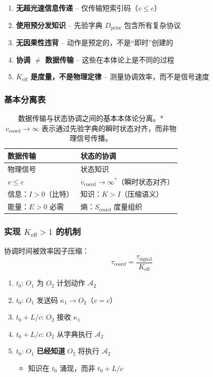 \documentclass[11pt,a4paper]{article}
\begin{document}
	\begin{enumerate}[leftmargin=*]
		\item \textbf{无超光速信息传递} – 仅传输短索引码（$v \leq c$）
		\item \textbf{使用预分发知识} – 先验字典 $D_{\text{prior}}$ 包含所有复杂协议
		\item \textbf{无因果性违背} – 动作是预定的，不是“即时”创建的
		\item \textbf{协调 $\neq$ 数据传输} – 这些在本体论上是不同的过程
		\item \textbf{$K_{\mathrm{eff}}$ 是度量，不是物理定律} – 测量协调效率，而不是信号速度
	\end{enumerate}
	
	\subsubsection{基本分离表}
	
	\begin{table}[H]
		\centering
		\begin{tabular}{|p{}|p{}|}
			\hline
			\textbf{数据传输} & \textbf{状态的协调} \\
			\hline
			物理信号 & 状态知识 \\
			$v \leq c$ & $v_{\text{coord}} \to \infty^*$（瞬时状态对齐） \\
			信息：$I > 0$（比特） & 知识：$K > I$（压缩语义） \\
			能量：$E > 0$ 必需 & 熵：$S_{\text{coord}}$ 度量组织 \\
			\hline
		\end{tabular}
		\caption{数据传输与状态协调之间的基本本体论分离。*$v_{\text{coord}} \to \infty$ 表示通过先验字典的瞬时状态对齐，而非物理信号传播。}
		\label{tab:coordination-vs-data}
	\end{table}
	
	\subsubsection{实现 $K_{\mathrm{eff}} > 1$ 的机制}
	
	协调时间被效率因子压缩：
	\begin{equation}
		\tau_{\text{coord}} = \frac{\tau_{\text{signal}}}{K_{\mathrm{eff}}}
	\end{equation}
	
	\begin{enumerate}[label=\arabic*.]
		\item $t_0$: $O_1$ 为 $O_2$ 计划动作 $\mathcal{A}_2$
		\item $t_0$: $O_1$ 发送码 $\kappa_1 \to O_2$（$v = c$）
		\item $t_0 + L/c$: $O_2$ 接收 $\kappa_1$
		\item $t_0 + L/c$: $O_2$ 从字典执行 $\mathcal{A}_2$
		\item $t_0$: $O_1$ \textbf{已经知道} $O_2$ 将执行 $\mathcal{A}_2$
		\begin{itemize}
			\item 知识在 $t_0$ 涌现，而非 $t_0 + L/c$
		\end{itemize}
	\end{enumerate}
	
\end{document}
